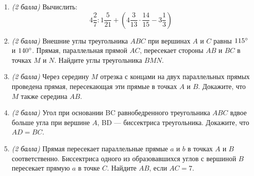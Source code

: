 \documentclass[12pt, a4paper]{article}
\begin{document}
		

\begin{enumerate}
	\item \textit{(2 балла)} Вычислить: $$4\dfrac{2}{7}:1\dfrac{5}{21}+\left(4\dfrac{3}{13}\cdot\dfrac{14}{15}-3\dfrac{1}{3}\right)$$
	\item \textit{(2 балла)} Внешние углы треугольника $ABC$ при вершинах $A$ и $C$ равны $115\degree$ и $140\degree$. Прямая, параллельная прямой $AC$, пересекает стороны $AB$ и $BC$ в точках $M$ и $N$. Найдите углы треугольника $BMN$.
	\item \textit{(2 балла)} Через середину $M$ отрезка с концами на двух параллельных прямых проведена прямая, пересекающая эти прямые в точках $A$ и $B$. Докажите, что $M$ также середина $AB$.
	\item \textit{(2 балла)} Угол при основании BC равнобедренного треугольника $ABC$ вдвое больше угла при вершине $A$, BD — биссектриса треугольника. Докажите, что $AD = BC$.
	\item \textit{(2 балла)} Прямая пересекает параллельные прямые $a$ и $b$ в точках $A$ и $B$ соответственно. Биссектриса одного из образовавшихся углов с вершиной $B$ пересекает прямую $a$ в точке $C$. Найдите $AB$, если $AC = 7$.
\end{enumerate}
\end{document}
